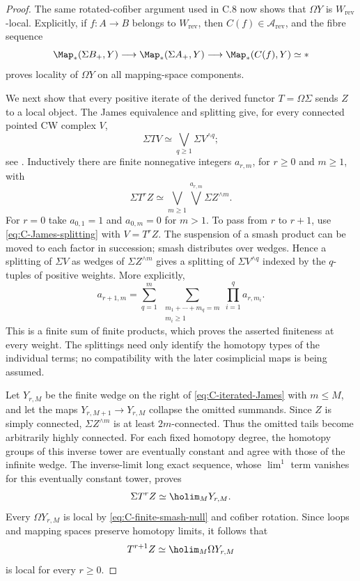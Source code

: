 \begin{proof}
The same rotated-cofiber argument used in C.8 now shows that $\Omega Y$ is $W_{\mathrm{rev}}$-local. Explicitly, if $f:A\to B$ belongs to $W_{\mathrm{rev}}$, then $C(f)\in\mathcal A_{\mathrm{rev}}$, and the fibre sequence
\[
 \Map_*(\Sigma B_+,Y)\longrightarrow
 \Map_*(\Sigma A_+,Y)\longrightarrow
 \Map_*(C(f),Y)\simeq *
\]
proves locality of $\Omega Y$ on all mapping-space components.

We next show that every positive iterate of the derived functor $T=\Omega\Sigma$ sends $Z$ to a local object. The James equivalence and splitting give, for every connected pointed CW complex $V$,
\begin{equation}\label{eq:C-James-splitting}
 \Sigma T V\simeq
 \bigvee_{q\geq1}\Sigma V^{\wedge q};
\end{equation}
see \cite[Proposition 4I.2 and Theorem 4J.1]{FGHHatcher2002}.
Inductively there are finite nonnegative integers $a_{r,m}$, for $r\geq0$ and $m\geq1$, with
\begin{equation}\label{eq:C-iterated-James}
 \Sigma T^r Z\simeq
 \bigvee_{m\geq1}\bigvee^{a_{r,m}}\Sigma Z^{\wedge m}.
\end{equation}
For $r=0$ take $a_{0,1}=1$ and $a_{0,m}=0$ for $m>1$. To pass from $r$ to $r+1$, use \eqref{eq:C-James-splitting} with $V=T^rZ$. The suspension of a smash product can be moved to each factor in succession; smash distributes over wedges. Hence a splitting of $\Sigma V$ as wedges of $\Sigma Z^{\wedge m}$ gives a splitting of $\Sigma V^{\wedge q}$ indexed by the $q$-tuples of positive weights. More explicitly,
\[
 a_{r+1,m}=
 \sum_{q=1}^m\ \sum_{\substack{m_1+\cdots+m_q=m\\m_i\geq1}}
          \prod_{i=1}^q a_{r,m_i}.
\]
This is a finite sum of finite products, which proves the asserted finiteness at every weight. The splittings need only identify the homotopy types of the individual terms; no compatibility with the later cosimplicial maps is being assumed.

Let $Y_{r,M}$ be the finite wedge on the right of \eqref{eq:C-iterated-James} with $m\leq M$, and let the maps $Y_{r,M+1}\to Y_{r,M}$ collapse the omitted summands. Since $Z$ is simply connected, $\Sigma Z^{\wedge m}$ is at least $2m$-connected. Thus the omitted tails become arbitrarily highly connected. For each fixed homotopy degree, the homotopy groups of this inverse tower are eventually constant and agree with those of the infinite wedge. The inverse-limit long exact sequence, whose $\lim^1$ term vanishes for this eventually constant tower, proves
\[
 \Sigma T^r Z\simeq\holim_M Y_{r,M}.
\]
Every $\Omega Y_{r,M}$ is local by \eqref{eq:C-finite-smash-null} and cofiber rotation. Since loops and mapping spaces preserve homotopy limits, it follows that
\[
 T^{r+1}Z\simeq\holim_M\Omega Y_{r,M}
\]
is local for every $r\geq0$.


\end{proof}
